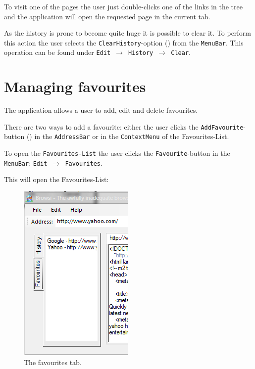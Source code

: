 To visit one of the pages the user just double-clicks one of the links in the tree and the application will open the requested page in the current tab.

As the history is prone to become quite huge it is possible to clear it. To perform this action the user selects the \texttt{ClearHistory}-option () from the \texttt{MenuBar}. This operation can be found under \texttt{Edit $\rightarrow$ History $\rightarrow$ Clear}.

\section{Managing favourites}
\label{sec:managing_favourites}

The application allows a user to add, edit and delete favourites.

There are two ways to add a favourite: either the user clicks the \texttt{AddFavourite}-button () in the \texttt{AddressBar} or in the \texttt{ContextMenu} of the Favourites-List.

To open the \texttt{Favourites-List} the user clicks the \texttt{Favourite}-button in the \texttt{MenuBar}: \texttt{Edit $\rightarrow$ Favourites}.

This will open the Favourites-List:

\begin{figure}[H]
\begin{center}
\includegraphics[scale=1]{gfx/favourites.png}
\caption{The favourites tab.}
\label{fig:favourites_tab}
\end{center}
\end{figure}

